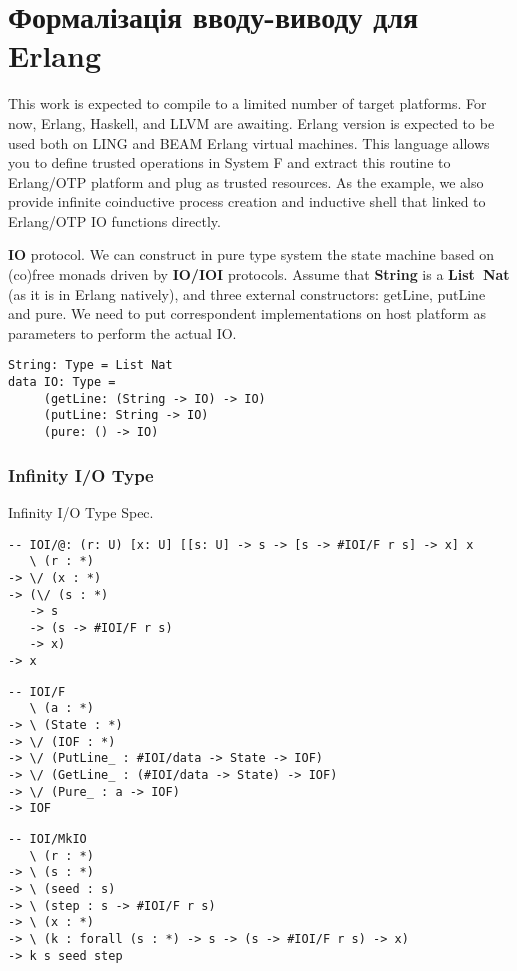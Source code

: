 \newpage
\section{Формалізація вводу-виводу для Erlang}

This work is expected to compile to a limited number of target platforms.
For now, Erlang, Haskell, and LLVM are awaiting.
Erlang version is expected to be used both on LING and BEAM Erlang virtual machines.
This language allows you to define trusted operations in System F and extract this routine to Erlang/OTP platform and plug as trusted resources.
As the example, we also provide infinite coinductive process creation and inductive shell that linked to Erlang/OTP IO functions directly.

{\bf IO} protocol.
We can construct in pure type system the state machine based on (co)free monads driven by {\bf IO/IOI} protocols.
Assume that {\bf String} is a {\bf List\ Nat} (as it is in Erlang natively), and three external constructors: getLine, putLine and pure.
We need to put correspondent implementations on host platform as parameters to perform the actual IO.

\begin{lstlisting}
String: Type = List Nat
data IO: Type =
     (getLine: (String -> IO) -> IO)
     (putLine: String -> IO)
     (pure: () -> IO)
\end{lstlisting}

\subsubsection{Infinity I/O Type}

Infinity I/O Type Spec.

\begin{lstlisting}
-- IOI/@: (r: U) [x: U] [[s: U] -> s -> [s -> #IOI/F r s] -> x] x
   \ (r : *)
-> \/ (x : *)
-> (\/ (s : *)
   -> s
   -> (s -> #IOI/F r s)
   -> x)
-> x
\end{lstlisting}

\begin{lstlisting}
-- IOI/F
   \ (a : *)
-> \ (State : *)
-> \/ (IOF : *)
-> \/ (PutLine_ : #IOI/data -> State -> IOF)
-> \/ (GetLine_ : (#IOI/data -> State) -> IOF)
-> \/ (Pure_ : a -> IOF)
-> IOF
\end{lstlisting}

\begin{lstlisting}
-- IOI/MkIO
   \ (r : *)
-> \ (s : *)
-> \ (seed : s)
-> \ (step : s -> #IOI/F r s)
-> \ (x : *)
-> \ (k : forall (s : *) -> s -> (s -> #IOI/F r s) -> x)
-> k s seed step
\end{lstlisting}

